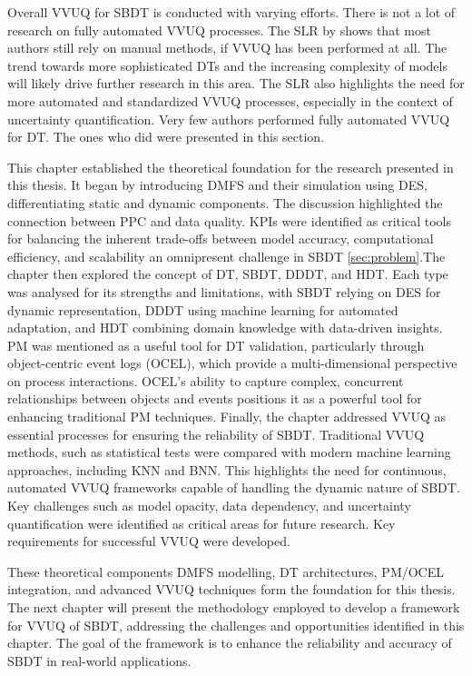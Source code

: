 Overall VVUQ for SBDT is conducted with varying efforts. There is not a lot of research on fully automated VVUQ processes. The SLR by \autocite{Bitencourt2023} shows that most authors still rely on manual methods, if VVUQ has been performed at all. The trend towards more sophisticated DTs and the increasing complexity of models will likely drive further research in this area. The SLR also highlights the need for more automated and standardized VVUQ processes, especially in the context of uncertainty quantification. Very few authors performed fully automated VVUQ for DT. The ones who did were presented in this section.

This chapter established the theoretical foundation for the research presented in this thesis. It began by introducing DMFS and their simulation using DES, differentiating static and dynamic components. The discussion highlighted the connection between PPC and data quality. KPIs were identified as critical tools for balancing the inherent trade-offs between model accuracy, computational efficiency, and scalability \textemdash an omnipresent challenge in SBDT \autoref{sec:problem}.The chapter then explored the concept of DT, SBDT, DDDT, and HDT. Each type was analysed for its strengths and limitations, with SBDT relying on DES for dynamic representation, DDDT using machine learning for automated adaptation, and HDT combining domain knowledge with data-driven insights. PM was mentioned as a useful tool for DT validation, particularly through object-centric event logs (OCEL), which provide a multi-dimensional perspective on process interactions. OCEL’s ability to capture complex, concurrent relationships between objects and events positions it as a powerful tool for enhancing traditional PM techniques. Finally, the chapter addressed VVUQ as essential processes for ensuring the reliability of SBDT. Traditional VVUQ methods, such as statistical tests were compared with modern machine learning approaches, including KNN and BNN. This highlights the need for continuous, automated VVUQ frameworks capable of handling the dynamic nature of SBDT. Key challenges such as model opacity, data dependency, and uncertainty quantification were identified as critical areas for future research. Key requirements for successful VVUQ were developed.

These theoretical components \textemdash DMFS modelling, DT architectures, PM/OCEL integration, and advanced VVUQ techniques \textemdash form the foundation for this thesis. The next chapter will present the methodology employed to develop a framework for VVUQ of SBDT, addressing the challenges and opportunities identified in this chapter. The goal of the framework is to enhance the reliability and accuracy of SBDT in real-world applications.




